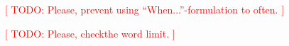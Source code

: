 \documentclass[preprint,12pt]{elsarticle}
\begin{document}
%
%
%
%
%
%
%
%

\textcolor{red}{[ TODO: Please, prevent using ``When...''-formulation to often. ]}


\textcolor{red}{[ TODO: Please, checkthe  word limit. ]}
\end{document}
